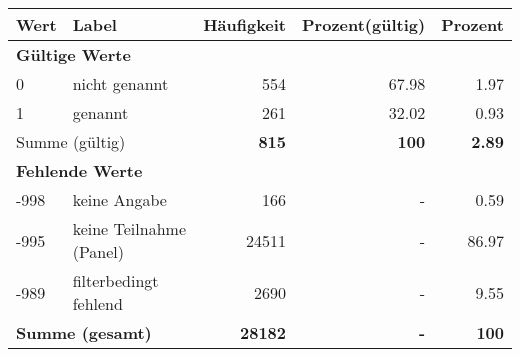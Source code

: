      \begin{longtable}{lXrrr}
     \toprule
     \textbf{Wert} & \textbf{Label} & \textbf{Häufigkeit} & \textbf{Prozent(gültig)} & \textbf{Prozent} \\
     \endhead
     \midrule
     \multicolumn{5}{l}{\textbf{Gültige Werte}}\\

     0 &
     \multicolumn{1}{X}{ nicht genannt   } &


       \num{554} &
       \num[round-mode=places,round-precision=2]{67,98} &
         \num[round-mode=places,round-precision=2]{1,97} \\

     1 &
     \multicolumn{1}{X}{ genannt   } &


       \num{261} &
       \num[round-mode=places,round-precision=2]{32,02} &
         \num[round-mode=places,round-precision=2]{0,93} \\
     \midrule
     \multicolumn{2}{l}{Summe (gültig)} &
       \textbf{\num{815}} &
     \textbf{100} &
       \textbf{\num[round-mode=places,round-precision=2]{2,89}} \\
     \multicolumn{5}{l}{\textbf{Fehlende Werte}}\\
       -998 &
       keine Angabe &
         \num{166} &
        - &
         \num[round-mode=places,round-precision=2]{0,59} \\
       -995 &
       keine Teilnahme (Panel) &
         \num{24511} &
        - &
         \num[round-mode=places,round-precision=2]{86,97} \\
       -989 &
       filterbedingt fehlend &
         \num{2690} &
        - &
         \num[round-mode=places,round-precision=2]{9,55} \\
     \midrule
     \multicolumn{2}{l}{\textbf{Summe (gesamt)}} &
          \textbf{\num{28182}} &
        \textbf{-} &
        \textbf{100} \\
     \bottomrule
     \end{longtable}
     
